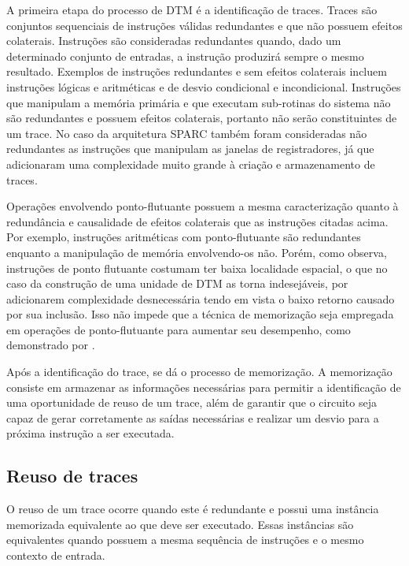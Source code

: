 A primeira etapa do processo de DTM é a identificação de traces. Traces são conjuntos sequenciais de instruções válidas redundantes e que não possuem efeitos colaterais. Instruções são consideradas redundantes quando, dado um determinado conjunto de entradas, a instrução produzirá sempre o mesmo resultado. Exemplos de instruções redundantes e sem efeitos colaterais incluem instruções lógicas e aritméticas e de desvio condicional e incondicional. Instruções que manipulam a memória primária e que executam sub-rotinas do sistema não são redundantes e possuem efeitos colaterais, portanto não serão constituintes de um trace. No caso da arquitetura SPARC também foram consideradas não redundantes as instruções que manipulam as janelas de registradores, já que adicionaram uma complexidade muito grande à criação e armazenamento de traces.

Operações envolvendo ponto-flutuante possuem a mesma caracterização quanto à redundância e causalidade de efeitos colaterais que as instruções citadas acima. Por exemplo, instruções aritméticas com ponto-flutuante são redundantes enquanto a manipulação de memória envolvendo-os não. Porém, como  observa, instruções de ponto flutuante costumam ter baixa localidade espacial, o que no caso da construção de uma unidade de DTM as torna indesejáveis, por adicionarem complexidade desnecessária tendo em vista o baixo retorno causado por sua inclusão. Isso não impede que a técnica de memorização seja empregada em operações de ponto-flutuante para aumentar seu desempenho, como demonstrado por .

Após a identificação do trace, se dá o processo de memorização. A memorização consiste em armazenar as informações necessárias para permitir a identificação de uma oportunidade de reuso de um trace, além de garantir que o circuito seja capaz de gerar corretamente as saídas necessárias e realizar um desvio para a próxima instrução a ser executada.



\subsection{Reuso de traces}
\label{Fundamentacao:DTM:Reuso}

O reuso de um trace ocorre quando este é redundante e possui uma instância memorizada equivalente ao que deve ser executado. Essas instâncias são equivalentes quando possuem a mesma sequência de instruções e o mesmo contexto de entrada.

